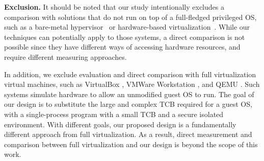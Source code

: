 \noindent
\textbf{Exclusion.}
It should be noted that our study intentionally excludes %
a comparison with solutions that do not run on top of a
full-fledged privileged OS, such as
a bare-metal hypervisor~\cite{Xen-03, VMWare-Server} or
hardware-based virtualization~\cite{IntelVT, keller2010nohype}.
While our techniques can potentially apply to those
systems, a direct comparison is not possible since they have different
ways of accessing hardware resources, and require different measuring approaches.

In addition, we exclude evaluation and direct comparison with full virtualization virtual machines,
such as VirtualBox \cite{VirtualBox}, VMWare Workstation \cite{VMWare-Workstation}, and QEMU \cite{QEMU}.
Such systems simulate hardware to allow an unmodified guest OS to run. The goal
of our design is to substitute the large and complex TCB required for a guest OS, with a single-process
program with a small TCB and a secure isolated environment. With different goals, our proposed design is 
a fundamentally different approach from full virtualization. As a result, direct measurement and comparison between full virtualization
and our design is
beyond the scope of this work.

